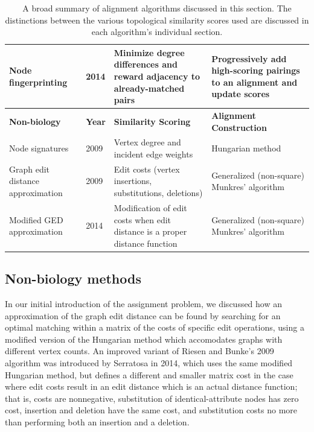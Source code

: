 \documentclass[12pt]{thesis}
\theoremstyle{plain}
\theoremstyle{definition}
\theoremstyle{remark}
\begin{document}
\begin{table}[!hp]
{\begin{tabular}{|L{0.2\textwidth}|L{0.055\textwidth}|L{0.33\textwidth}|L{0.31\textwidth}|}
Node fingerprinting \cite{radu2014node} & 2014 & Minimize degree differences and reward adjacency to already-matched pairs & Progressively add high-scoring pairings to an alignment and update scores\\ \hline\hline
\textbf{Non-biology}  & \textbf{Year} & \textbf{Similarity Scoring} & \textbf{Alignment Construction} \\ \hline

Node signatures \cite{Jouili_2009} & 2009 & Vertex degree and incident edge weights & Hungarian method \\ \hline

Graph edit distance approximation \cite{Riesen_2009} & 2009 & Edit costs (vertex insertions, substitutions, deletions) & Generalized (non-square) Munkres' algorithm \\ \hline
Modified GED approximation \cite{Serratosa_2014} & 2014 & Modification of edit costs when edit distance is a proper distance function & Generalized (non-square) Munkres' algorithm \\ \hline 
\end{tabular}
}
\caption{A broad summary of alignment algorithms discussed in this section. The distinctions between the various topological similarity scores used are discussed in each algorithm's individual section.}
\label{tab:alignment_algorithms}
\end{table}

\subsection{Non-biology methods}

In our initial introduction of the assignment problem, we discussed how an approximation of the graph edit distance can be found by searching for an optimal matching within a matrix of the costs of specific edit operations, using a modified version of the Hungarian method \cite{Riesen_2009} which accomodates graphs with different vertex counts. An improved variant of Riesen and Bunke's 2009 algorithm was introduced by Serratosa in 2014, which uses the same modified Hungarian method, but defines a different and smaller matrix cost in the case where edit costs result in an edit distance which is an actual distance function; that is, costs are nonnegative, substitution of identical-attribute nodes has zero cost, insertion and deletion have the same cost, and substitution costs no more than performing both an insertion and a deletion.
\end{document}
